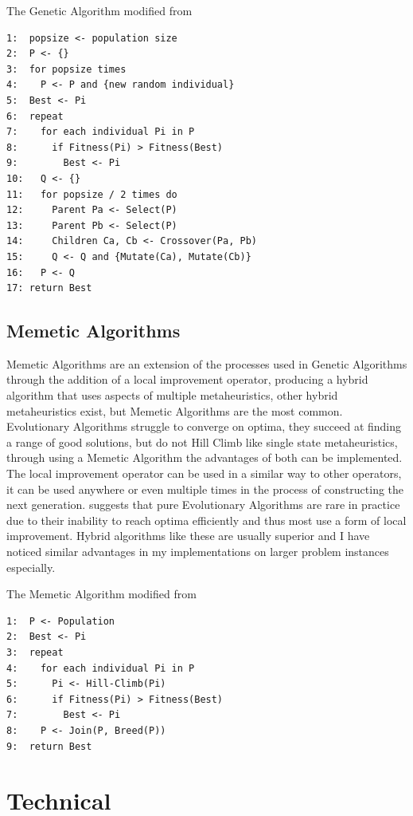 \documentclass[]{final_report}
\begin{document}
The Genetic Algorithm modified from \cite{luke:2013}

\begin{verbatim}
1:  popsize <- population size
2:  P <- {}
3:  for popsize times
4:    P <- P and {new random individual}
5:  Best <- Pi
6:  repeat
7:    for each individual Pi in P
8:      if Fitness(Pi) > Fitness(Best)
9:        Best <- Pi
10:   Q <- {}
11:   for popsize / 2 times do
12:     Parent Pa <- Select(P)
13:     Parent Pb <- Select(P)
14:     Children Ca, Cb <- Crossover(Pa, Pb)
15:     Q <- Q and {Mutate(Ca), Mutate(Cb)}
16:   P <- Q
17: return Best
\end{verbatim}

\newpage
\section*{Memetic Algorithms}

Memetic Algorithms are an extension of the processes used in Genetic Algorithms through the addition of a local improvement operator, producing a hybrid algorithm that uses aspects of multiple metaheuristics, other hybrid metaheuristics exist, but Memetic Algorithms are the most common. Evolutionary Algorithms struggle to converge on optima, they succeed at finding a range of good solutions, but do not Hill Climb like single state metaheuristics, through using a Memetic Algorithm the advantages of both can be implemented. The local improvement operator can be used in a similar way to other operators, it can be used anywhere or even multiple times in the process of constructing the next generation\cite{cotta:2004}. \cite{glover:2015} suggests that pure Evolutionary Algorithms are rare in practice due to their inability to reach optima efficiently and thus most use a form of local improvement. Hybrid algorithms like these are usually superior and I have noticed similar advantages in my implementations on larger problem instances especially.

The Memetic Algorithm modified from \cite{luke:2013}

\begin{verbatim}
1:  P <- Population
2:  Best <- Pi
3:  repeat
4:    for each individual Pi in P
5:      Pi <- Hill-Climb(Pi)
6:      if Fitness(Pi) > Fitness(Best)
7:        Best <- Pi
8:    P <- Join(P, Breed(P))
9:  return Best
\end{verbatim}

\chapter*{Technical}
\end{document}
